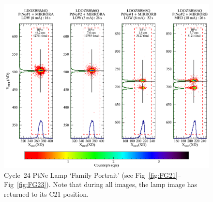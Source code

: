 \begin{center}
	\begin{figure}[htb]
	\noindent\includegraphics*[width=1.0\linewidth]{png/C24_14857_FP.png}
	\caption[C24 WCA Lamp `Family Portrait']{Cycle~24 PtNe Lamp `Family Portrait' (see Fig~\ref{fig:FG21}--Fig~\ref{fig:FG23}).
	Note that during all images, the lamp image has returned to its C21 position.\label{fig:FG24}}
	\end{figure}
\end{center}
